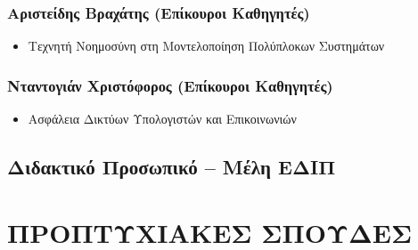 \documentclass[
]{article}
\begin{document}
\hypertarget{ux3b1ux3c1ux3b9ux3c3ux3c4ux3b5ux3afux3b4ux3b7ux3c2-ux3b2ux3c1ux3b1ux3c7ux3acux3c4ux3b7ux3c2-ux3b5ux3c0ux3afux3baux3bfux3c5ux3c1ux3bfux3b9-ux3baux3b1ux3b8ux3b7ux3b3ux3b7ux3c4ux3adux3c2}{%
\subsubsection{Αριστείδης Βραχάτης (Επίκουροι
Καθηγητές)}\label{ux3b1ux3c1ux3b9ux3c3ux3c4ux3b5ux3afux3b4ux3b7ux3c2-ux3b2ux3c1ux3b1ux3c7ux3acux3c4ux3b7ux3c2-ux3b5ux3c0ux3afux3baux3bfux3c5ux3c1ux3bfux3b9-ux3baux3b1ux3b8ux3b7ux3b3ux3b7ux3c4ux3adux3c2}}

\begin{itemize}
\item
  Τεχνητή Νοημοσύνη στη Μοντελοποίηση Πολύπλοκων Συστημάτων
\end{itemize}

\hypertarget{ux3bdux3c4ux3b1ux3bdux3c4ux3bfux3b3ux3b9ux3acux3bd-ux3c7ux3c1ux3b9ux3c3ux3c4ux3ccux3c6ux3bfux3c1ux3bfux3c2-ux3b5ux3c0ux3afux3baux3bfux3c5ux3c1ux3bfux3b9-ux3baux3b1ux3b8ux3b7ux3b3ux3b7ux3c4ux3adux3c2}{%
\subsubsection{Νταντογιάν Χριστόφορος (Επίκουροι
Καθηγητές)}\label{ux3bdux3c4ux3b1ux3bdux3c4ux3bfux3b3ux3b9ux3acux3bd-ux3c7ux3c1ux3b9ux3c3ux3c4ux3ccux3c6ux3bfux3c1ux3bfux3c2-ux3b5ux3c0ux3afux3baux3bfux3c5ux3c1ux3bfux3b9-ux3baux3b1ux3b8ux3b7ux3b3ux3b7ux3c4ux3adux3c2}}

\begin{itemize}
\item
  Ασφάλεια Δικτύων Υπολογιστών και Επικοινωνιών
\end{itemize}

\hypertarget{ux3b4ux3b9ux3b4ux3b1ux3baux3c4ux3b9ux3baux3cc-ux3c0ux3c1ux3bfux3c3ux3c9ux3c0ux3b9ux3baux3cc-ux3bcux3adux3bbux3b7-ux3b5ux3b4ux3b9ux3c0}{%
\subsection{Διδακτικό Προσωπικό -- Μέλη
ΕΔΙΠ}\label{ux3b4ux3b9ux3b4ux3b1ux3baux3c4ux3b9ux3baux3cc-ux3c0ux3c1ux3bfux3c3ux3c9ux3c0ux3b9ux3baux3cc-ux3bcux3adux3bbux3b7-ux3b5ux3b4ux3b9ux3c0}}

\hypertarget{ux3c0ux3c1ux3bfux3c0ux3c4ux3c5ux3c7ux3b9ux3b1ux3baux3b5ux3c3-ux3c3ux3c0ux3bfux3c5ux3b4ux3b5ux3c3}{%
\section{ΠΡΟΠΤΥΧΙΑΚΕΣ
ΣΠΟΥΔΕΣ}\label{ux3c0ux3c1ux3bfux3c0ux3c4ux3c5ux3c7ux3b9ux3b1ux3baux3b5ux3c3-ux3c3ux3c0ux3bfux3c5ux3b4ux3b5ux3c3}}
\end{document}

